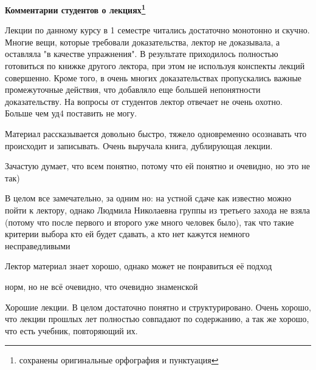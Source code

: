 		\textbf{Комментарии студентов о лекциях\protect\footnote{сохранены оригинальные орфография и пунктуация}}

		\begin{commentbox}
			Лекции по данному курсу в 1 семестре читались достаточно монотонно и скучно. Многие вещи, которые требовали доказательства, лектор не доказывала, а оставляла "в качестве упражнения". В результате приходилось полностью готовиться по книжке другого лектора, при этом не используя конспекты лекций совершенно. Кроме того, в очень многих доказательствах пропускались важные промежуточные действия, что добавляло еще большей непонятности доказательству. На вопросы от студентов лектор отвечает не очень охотно. Больше чем уд4 поставить не могу.
		\end{commentbox}

		\begin{commentbox}
			Материал рассказывается довольно быстро, тяжело одновременно осознавать что происходит и записывать. Очень выручала книга, дублирующая лекции.
		\end{commentbox}

		\begin{commentbox}
			Зачастую думает, что всем понятно, потому что ей понятно и очевидно, но это не так)
		\end{commentbox}

		\begin{commentbox}
			В целом все замечательно, за одним  но: на устной сдаче как известно можно пойти к лектору, однако Людмила Николаевна группы из третьего захода не взяла (потому что после первого и второго уже много человек было), так что такие критерии выбора кто ей будет сдавать, а кто нет кажутся немного несправедливыми
		\end{commentbox}

		\begin{commentbox}
			Лектор материал знает хорошо, однако может не понравиться её подход
		\end{commentbox}

		\begin{commentbox}
			норм, но не всё очевидно, что очевидно знаменской
		\end{commentbox}

		\begin{commentbox}
			Хорошие лекции. В целом достаточно понятно и структурировано. Очень хорошо, что лекции прошлых лет полностью совпадают по содержанию, а так же хорошо, что есть учебник, повторяющий их.
		\end{commentbox}

